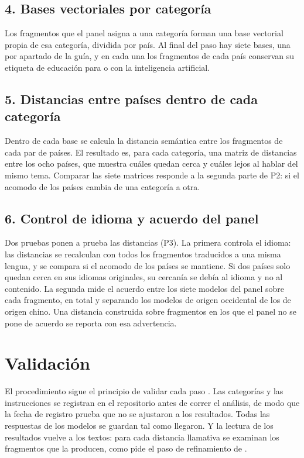 \subsection*{4. Bases vectoriales por categoría}

Los fragmentos que el panel asigna a una categoría forman una base vectorial propia de esa
categoría, dividida por país. Al final del paso hay siete bases, una por apartado de la
guía, y en cada una los fragmentos de cada país conservan su etiqueta de educación para o
con la inteligencia artificial.

\subsection*{5. Distancias entre países dentro de cada categoría}

Dentro de cada base se calcula la distancia semántica entre los fragmentos de cada par de
países. El resultado es, para cada categoría, una matriz de distancias entre los ocho
países, que muestra cuáles quedan cerca y cuáles lejos al hablar del mismo tema. Comparar
las siete matrices responde a la segunda parte de P2: si el acomodo de los países cambia
de una categoría a otra.

\subsection*{6. Control de idioma y acuerdo del panel}

Dos pruebas ponen a prueba las distancias (P3). La primera controla el idioma: las
distancias se recalculan con todos los fragmentos traducidos a una misma lengua, y se
compara si el acomodo de los países se mantiene. Si dos países solo quedan cerca en sus
idiomas originales, su cercanía se debía al idioma y no al contenido. La segunda mide el
acuerdo entre los siete modelos del panel sobre cada fragmento, en total y separando los
modelos de origen occidental de los de origen chino. Una distancia construida sobre
fragmentos en los que el panel no se pone de acuerdo se reporta con esa advertencia.

\section{Validación}
\label{sec:validacion}

El procedimiento sigue el principio de validar cada paso \citep{grimmer2013text}. Las
categorías y las instrucciones se registran en el repositorio antes de correr el análisis,
de modo que la fecha de registro prueba que no se ajustaron a los resultados. Todas las
respuestas de los modelos se guardan tal como llegaron. Y la lectura de los resultados
vuelve a los textos: para cada distancia llamativa se examinan los fragmentos que la
producen, como pide el paso de refinamiento de \citet{nelson2020computational}.
